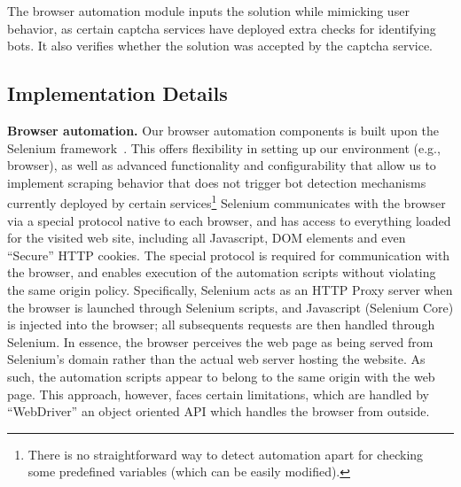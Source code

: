 \protect{} The browser automation module inputs the solution while mimicking 
user behavior, as certain captcha services have deployed extra checks for identifying bots.
It also verifies whether the solution was accepted by the captcha service.

\subsection{Implementation Details}

\textbf{Browser automation.}
Our browser automation components is built upon the Selenium framework~\cite{selenium}. This offers
flexibility in setting up our environment (e.g., browser), as well as advanced functionality
and configurability that allow us to implement scraping behavior that does not trigger bot detection
mechanisms currently deployed by certain services\footnote{There is no straightforward way to detect 
automation apart for checking some predefined variables (which can be easily modified).}
Selenium communicates with the browser via a special protocol 
native to each browser, and has access to everything loaded for the visited web site, including all Javascript, DOM 
elements and even ``Secure'' HTTP cookies. The special protocol is required for communication with the browser,
and enables execution of the automation scripts without violating the same origin policy.
Specifically, Selenium acts as an HTTP Proxy server when
the browser is launched through Selenium scripts, and Javascript (Selenium Core) is injected into the browser;
all subsequents requests are then handled through Selenium. In essence, the browser perceives the
web page as being served from Selenium's domain rather than the actual web server hosting the website.
As such, the automation scripts appear to belong to the same origin with the web page. This approach, 
however, faces certain limitations, which are handled by ``WebDriver'' an object oriented API
which handles the browser from outside. 


